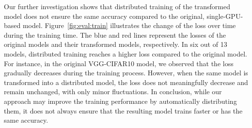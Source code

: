 

\begin{inred}
Our further investigation shows that distributed training of the transformed model
does not ensure the same accuracy compared to the original, single-GPU-based model.
Figure~\ref{fig:eval:train} illustrates the change of the loss over time
during the training time.
The blue and red lines represent the losses of the
original models and their transformed models, respectively.
In six out of 13 models, distributed training reaches a higher loss compared to
the original model.
For instance, in the original VGG-CIFAR10 model, we observed that the loss
gradually decreases during the training process. 
However, when the same model is transformed into a distributed model,
the loss does not meaningfully decrease and remain unchanged, 
with only minor fluctuations.
In conclusion, while our approach may improve the training performance by
automatically distributing them, it does not always ensure that the
resulting model trains faster or has the same accuracy.
\end{inred}




